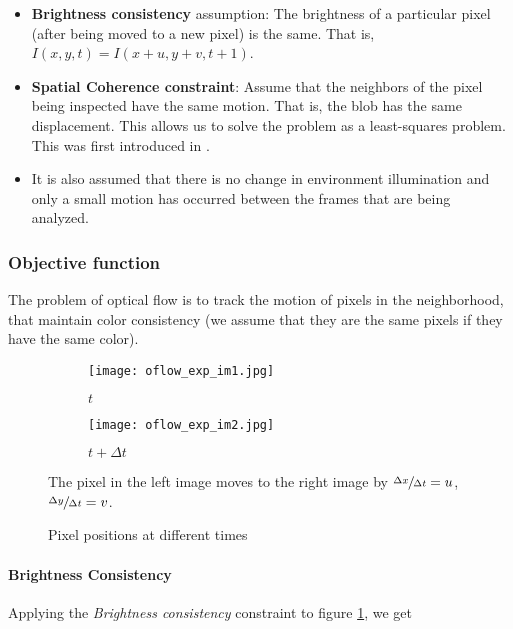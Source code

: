 \begin{itemize}
    \item \textbf{Brightness consistency} assumption: The brightness of a particular pixel (after being moved to a new pixel) is the same. That is, $I(x, y, t) = I(x+u, y+v, t+1)$.
    \item \textbf{Spatial Coherence constraint}: Assume that the neighbors of the pixel being inspected have the same motion. That is, the blob has the same displacement. This allows us to solve the problem as a least-squares problem. This was first introduced in \cite{lucas1981iterative}.
    \item It is also assumed that there is no change in environment illumination and only a small motion has occurred between the frames that are being analyzed.
\end{itemize}

\subsubsection{Objective function}

The problem of optical flow is to track the motion of pixels in the neighborhood, that maintain color consistency (we assume that they are the same pixels if they have the same color).

\begin{figure}[h]
    \centering
    \begin{subfigure}[b]{0.4\textwidth}
        \centering
        \texttt{[image: oflow\_exp\_im1.jpg]}
        \caption{$t$}
    \end{subfigure}
    \begin{subfigure}[b]{0.4\textwidth}
        \centering
        \texttt{[image: oflow\_exp\_im2.jpg]}
        \caption{$t+\Delta t$}
    \end{subfigure}
    \caption{Pixel positions at different times}
    \label{fig:q1-opflow-fig}
    \small
        The pixel in the left image moves to the right image by $\sfrac{\Delta x}{\Delta t} = u$, $\sfrac{\Delta y}{\Delta t} = v$.
\end{figure}

\paragraph*{Brightness Consistency}

Applying the \emph{Brightness consistency} constraint to figure \ref{fig:q1-opflow-fig}, we get

